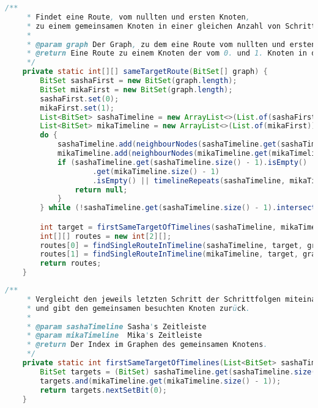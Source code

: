 \documentclass[a4paper,10pt,ngerman]{scrartcl}
\begin{document}
	
	\begin{lstlisting}[frame=single,language=Java,title=Methode sameTargetRoute,breaklines=true]
    /**
     * Findet eine Route, vom nullten und ersten Knoten,
     * zu einem gemeinsamen Knoten in einer gleichen Anzahl von Schritten.
     *
     * @param graph Der Graph, zu dem eine Route vom nullten und ersten Knoten zu einem gemeinsamen Knoten gebildet werden soll.
     * @return Eine Route zu einem Knoten der vom 0. und 1. Knoten in der gleichen Anzahl von Schritten erreichbar ist.
     */
    private static int[][] sameTargetRoute(BitSet[] graph) {
        BitSet sashaFirst = new BitSet(graph.length);
        BitSet mikaFirst = new BitSet(graph.length);
        sashaFirst.set(0);
        mikaFirst.set(1);
        List<BitSet> sashaTimeline = new ArrayList<>(List.of(sashaFirst));
        List<BitSet> mikaTimeline = new ArrayList<>(List.of(mikaFirst));
        do {
            sashaTimeline.add(neighbourNodes(sashaTimeline.get(sashaTimeline.size() - 1), graph));
            mikaTimeline.add(neighbourNodes(mikaTimeline.get(mikaTimeline.size() - 1), graph));
            if (sashaTimeline.get(sashaTimeline.size() - 1).isEmpty() || mikaTimeline
                    .get(mikaTimeline.size() - 1)
                    .isEmpty() || timelineRepeats(sashaTimeline, mikaTimeline)) {
                return null;
            }
        } while (!sashaTimeline.get(sashaTimeline.size() - 1).intersects(mikaTimeline.get(mikaTimeline.size() - 1)));

        int target = firstSameTargetOfTimelines(sashaTimeline, mikaTimeline);
        int[][] routes = new int[2][];
        routes[0] = findSingleRouteInTimeline(sashaTimeline, target, graph);
        routes[1] = findSingleRouteInTimeline(mikaTimeline, target, graph);
        return routes;
    }
	\end{lstlisting}
	
	
	\begin{lstlisting}[frame=single,language=Java,title=Methode firstSameTargetOfTimelines,breaklines=true]
    /**
     * Vergleicht den jeweils letzten Schritt der Schrittfolgen miteinander
     * und gibt den gemeinsamen besuchten Knoten zurück.
     *
     * @param sashaTimeline Sasha's Zeitleiste
     * @param mikaTimeline  Mika's Zeitleiste
     * @return Der Index im Graphen des gemeinsamen Knotens.
     */
    private static int firstSameTargetOfTimelines(List<BitSet> sashaTimeline, List<BitSet> mikaTimeline) {
        BitSet targets = (BitSet) sashaTimeline.get(sashaTimeline.size() - 1).clone();
        targets.and(mikaTimeline.get(mikaTimeline.size() - 1));
        return targets.nextSetBit(0);
    }
	\end{lstlisting}
	
\end{document}
